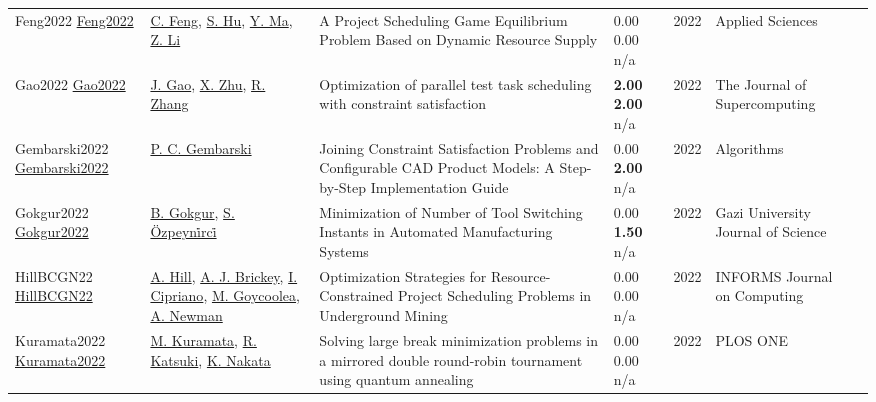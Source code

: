 {\begin{longtable}{p{3cm}p{5cm}p{10cm}p{1cm}rp{2.5cm}l}
Feng2022 \href{http://dx.doi.org/10.3390/app12189062}{Feng2022} & \hyperref[auth:a1738]{C. Feng}, \hyperref[auth:a1739]{S. Hu}, \hyperref[auth:a1740]{Y. Ma}, \hyperref[auth:a1741]{Z. Li} & \cellcolor{gold!20}A Project Scheduling Game Equilibrium Problem Based on Dynamic Resource Supply & \noindent{}\textcolor{black!50}{0.00} \textcolor{black!50}{0.00} n/a & 2022 & Applied Sciences & \cite{Feng2022}\\
Gao2022 \href{http://dx.doi.org/10.1007/s11227-022-04943-0}{Gao2022} & \hyperref[auth:a1837]{J. Gao}, \hyperref[auth:a1838]{X. Zhu}, \hyperref[auth:a1839]{R. Zhang} & Optimization of parallel test task scheduling with constraint satisfaction & \noindent{}\textbf{2.00} \textbf{2.00} n/a & 2022 & The Journal of Supercomputing & \cite{Gao2022}\\
Gembarski2022 \href{http://dx.doi.org/10.3390/a15090318}{Gembarski2022} & \hyperref[auth:a1991]{P. C. Gembarski} & \cellcolor{gold!20}Joining Constraint Satisfaction Problems and Configurable CAD Product Models: A Step-by-Step Implementation Guide & \noindent{}\textcolor{black!50}{0.00} \textbf{2.00} n/a & 2022 & Algorithms & \cite{Gembarski2022}\\
Gokgur2022 \href{http://dx.doi.org/10.35378/gujs.681151}{Gokgur2022} & \hyperref[auth:a1612]{B. Gokgur}, \hyperref[auth:a1613]{S. Özpeyni̇rci̇} & \cellcolor{gold!20}Minimization of Number of Tool Switching Instants in Automated Manufacturing Systems & \noindent{}\textcolor{black!50}{0.00} \textbf{1.50} n/a & 2022 & Gazi University Journal of Science & \cite{Gokgur2022}\\
HillBCGN22 \href{http://dx.doi.org/10.1287/ijoc.2022.1222}{HillBCGN22} & \hyperref[auth:a64]{A. Hill}, \hyperref[auth:a971]{A. J. Brickey}, \hyperref[auth:a972]{I. Cipriano}, \hyperref[auth:a973]{M. Goycoolea}, \hyperref[auth:a974]{A. Newman} & Optimization Strategies for Resource-Constrained Project Scheduling Problems in Underground Mining & \noindent{}\textcolor{black!50}{0.00} \textcolor{black!50}{0.00} n/a & 2022 & \cellcolor{red!20}INFORMS Journal on Computing & \cite{HillBCGN22}\\
Kuramata2022 \href{http://dx.doi.org/10.1371/journal.pone.0266846}{Kuramata2022} & \hyperref[auth:a1690]{M. Kuramata}, \hyperref[auth:a1691]{R. Katsuki}, \hyperref[auth:a1692]{K. Nakata} & \cellcolor{gold!20}Solving large break minimization problems in a mirrored double round-robin tournament using quantum annealing & \noindent{}\textcolor{black!50}{0.00} \textcolor{black!50}{0.00} n/a & 2022 & PLOS ONE & \cite{Kuramata2022}\\

\end{longtable}}
